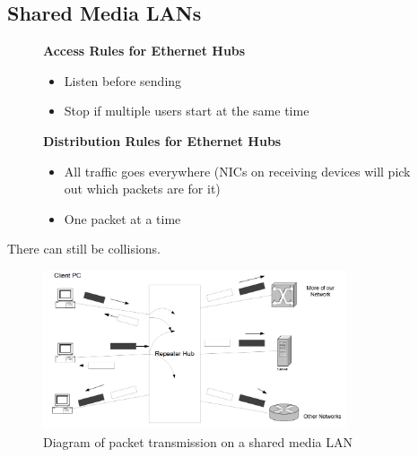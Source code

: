 \subsection*{Shared Media LANs}
\begin{figure}[H]
    \begin{minipage}[t]{0.45\textwidth}
        \textbf{Access Rules for Ethernet Hubs}
        \begin{itemize}
            \item Listen before sending
            \item Stop if multiple users start at the same time
        \end{itemize}
    \end{minipage}\hfill
    \begin{minipage}[t]{0.45\textwidth}
        \textbf{Distribution Rules for Ethernet Hubs}
        \begin{itemize}
            \item All traffic goes everywhere (NICs on receiving devices will pick out which packets are for it)
            \item One packet at a time
        \end{itemize}
    \end{minipage}\hfill
\end{figure}
There can still be collisions.
\begin{figure}[H]
    \centering
    \includegraphics[width=0.8\textwidth]{assets/access-distro-shared-media-lans.png}
    \caption{Diagram of packet transmission on a shared media LAN}
\end{figure}
